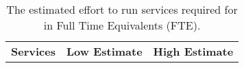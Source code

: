 \setlength{\mycolwidth}{5.5cm}
\begin{table} \centering
{}
\begin{tabular}{p{\mycolwidth} p{\mycolwidth} p{\mycolwidth}}
{\bf Services} & {\bf Low Estimate} & {\bf High Estimate} \\

\end{tabular}
\caption{The estimated effort to run \einfra services required for \ED in Full Time Equivalents (FTE). \label{tab:effort}}
\end{table}
